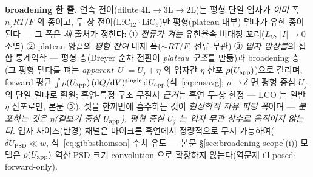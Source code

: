 \begin{keybox}
\textbf{broadening 한 줄.} 연속 전이(dilute$\cdot$4L$\to$3L$\to$2L)는 평형 단일 입자가 \emph{이미} 폭 $n_jRT/F$ 의 종이고,
두-상 전이($\mathrm{LiC_{12}}\cdot\mathrm{LiC_6}$)만 평형(plateau 내부) 델타가 유한 종이 된다 --- 그 폭은 \emph{세}
출처가 정한다: ① \emph{전류가 켜는} 유한율속 비대칭 꼬리($L_V$, $|I|\!\to\!0$ 소멸) ② plateau 양끝의 \emph{평형 잔여}
내재 폭($\sim RT/F$, 전류 무관) ③ \emph{입자 앙상블}의 집합 통계역학 --- 평형 층(Dreyer 순차 전환이 \emph{plateau 구조}를
만듦)과 broadening 층(그 평형 델타를 펴는 \emph{apparent-U $=U_j+\eta$} 의 입자간 $\eta$ 산포 $\rho(U_{\mathrm{app}})$)으로 갈리며,
forward 평균 $\int\rho(U_{\mathrm{app}})\,(\mathrm{d} Q/\mathrm{d} V)^\mathrm{single}\,\mathrm{d} U_{\mathrm{app}}$(식~\eqref{eq:ensavg}; $\rho\!\to\!\delta$ 면
평형 중심 $U_j$ 의 단일 델타로 환원; 흑연-특정 구조 무질서 \emph{근거}는 흑연 두-상 한정 --- LCO 는 일반
$\eta$ 산포로만, 본문 ③). 셋을 한꺼번에 흡수하는 것이 \emph{현상학적 자유 피팅 폭}이며 ---
\emph{분포하는 것은 $\eta$(겉보기 중심 $U_{\mathrm{app}}$), 평형 중심 $U_j$ 는 입자 무관 상수로 움직이지 않는다}. 입자
사이즈(반경) 채널은 마이크론 흑연에서 정량적으로 무시 가능하여($\delta U_\mathrm{PSD}\ll w$,
식~\eqref{eq:gibbsthomson} 수치 유도 --- 본문 \S\ref{sec:broadening-scope}(i)) 모델은 $\rho(U_{\mathrm{app}})$ 역산$\cdot$PSD 크기 convolution
으로 확장하지 않는다(역문제 ill-posed$\cdot$forward-only).
\end{keybox}

